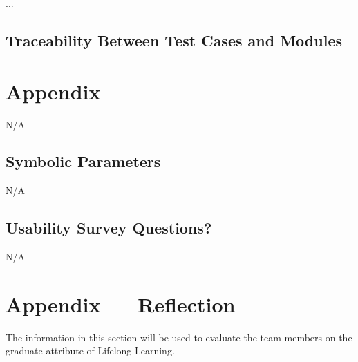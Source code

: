 \documentclass[12pt, titlepage]{article}
\begin{document}
...

\subsection{Traceability Between Test Cases and Modules}

				




\newpage

\section{Appendix}

N/A

\subsection{Symbolic Parameters}

N/A

\subsection{Usability Survey Questions?}

N/A

\newpage{}
\section*{Appendix --- Reflection}


The information in this section will be used to evaluate the team members on the
graduate attribute of Lifelong Learning.


\end{document}
